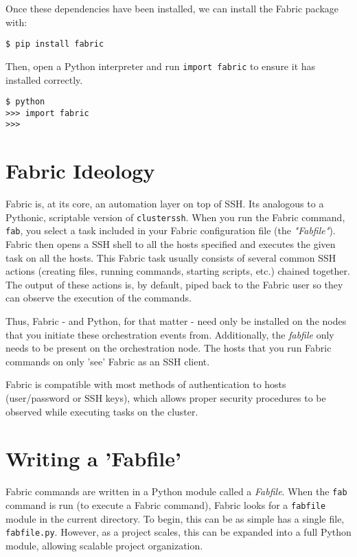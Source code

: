 \documentclass[9pt,twocolumn,twoside]{idsi}
\begin{document}
Once these dependencies have been installed, we can install the Fabric package with: 
\begin{verbatim}
$ pip install fabric
\end{verbatim}
Then, open a Python interpreter and run \texttt{import fabric} to ensure it has installed correctly.

\begin{verbatim}
$ python
>>> import fabric
>>> 
\end{verbatim}

\section{Fabric Ideology}
Fabric is, at its core, an automation layer on top of SSH. Its analogous to a Pythonic, scriptable version of \texttt{clusterssh}. When you run the Fabric command, \texttt{fab}, you select a task included in your Fabric configuration file (the \emph{"Fabfile"}). Fabric then opens a SSH shell to all the hosts specified and executes the given task on all the hosts. This Fabric task usually consists of several common SSH actions (creating files, running commands, starting scripts, etc.) chained together. The output of these actions is, by default, piped back to the Fabric user so they can observe the execution of the commands.

Thus, Fabric - and Python, for that matter - need only be installed on the nodes that you initiate these orchestration events from. Additionally, the \emph{fabfile} only needs to be present on the orchestration node. The hosts that you run Fabric commands on only 'see' Fabric as an SSH client.

Fabric is compatible with most methods of authentication to hosts (user/password or SSH keys), which allows proper security procedures to be observed while executing tasks on the cluster.

\section{Writing a 'Fabfile'}
Fabric commands are written in a Python module called a \emph{Fabfile}. When the \texttt{fab} command is run (to execute a Fabric command), Fabric looks for a \texttt{fabfile} module in the current directory. To begin, this can be as simple has a single file, \texttt{fabfile.py}. However, as a project scales, this can be expanded into a full Python module, allowing scalable project organization.
\end{document}
